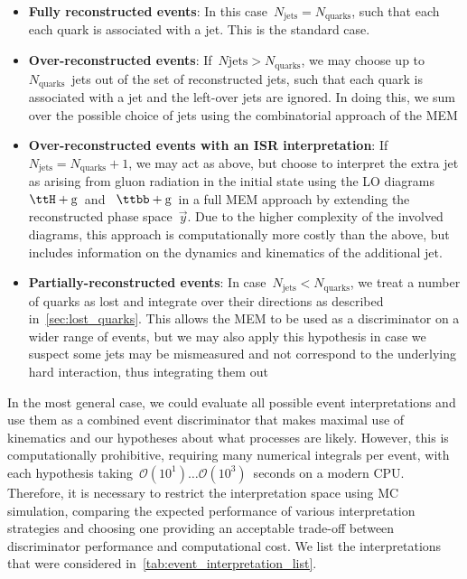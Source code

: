 \begin{itemize}
\item \textbf{Fully reconstructed events}: In this case~$N_{\mathrm{jets}} = N_{\mathrm{quarks}}$, such that each each quark is associated with a jet. This is the standard case.
\item \textbf{Over-reconstructed events}: If~$N{\mathrm{jets}} > N_{\mathrm{quarks}}$, we may choose up to~$N_{\mathrm{quarks}}$~jets out of the set of reconstructed jets, such that each quark is associated with a jet and the left-over jets are ignored. In doing this, we sum over the possible choice of jets using the combinatorial approach of the MEM
\item \textbf{Over-reconstructed events with an ISR interpretation}: If~$N_{\mathrm{jets}} = N_{\mathrm{quarks}} + 1$, we may act as above, but choose to interpret the extra jet as arising from gluon radiation in the initial state using the LO diagrams~$\ttH + \mathrm{g}$~and ~$\ttbb + \mathrm{g}$~in a full MEM approach by extending the reconstructed phase space~$\vec{y}$. Due to the higher complexity of the involved diagrams, this approach is computationally more costly than the above, but includes information on the dynamics and kinematics of the additional jet.
\item \textbf{Partially-reconstructed events}: In case~$N_{\mathrm{jets}} < N_{\mathrm{quarks}}$, we treat a number of quarks as lost and integrate over their directions as described in~\cref{sec:lost_quarks}. This allows the MEM to be used as a discriminator on a wider range of events, but we may also apply this hypothesis in case we suspect some jets may be mismeasured and not correspond to the underlying hard interaction, thus integrating them out
\end{itemize}

In the most general case, we could evaluate all possible event interpretations and use them as a combined event discriminator that makes maximal use of kinematics and our hypotheses about what processes are likely. However, this is computationally prohibitive, requiring many numerical integrals per event, with each hypothesis taking~$\mathcal{O}(10^1)\dots \mathcal{O}(10^3)$~seconds on a modern CPU. Therefore, it is necessary to restrict the interpretation space using MC simulation, comparing the expected performance of various interpretation strategies and choosing one providing an acceptable trade-off between discriminator performance and computational cost. We list the interpretations that were considered in~\cref{tab:event_interpretation_list}.

